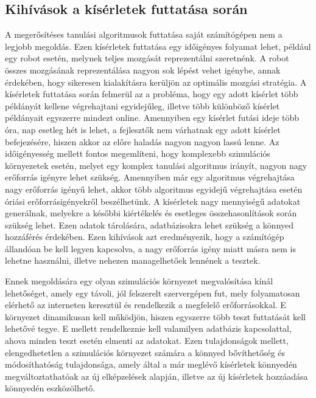\subsection{Kihívások a kísérletek futtatása során}
A megerősítéses tanulási algoritmusok futtatása saját számítógépen nem a legjobb megoldás. Ezen kísérletek futtatása egy időigényes folyamat lehet, például egy robot esetén, melynek teljes mozgását reprezentálni szeretnénk. A robot összes mozgásának reprezentálása nagyon sok lépést vehet igénybe, annak érdekében, hogy sikeresen kialakításra kerüljön az optimális mozgási stratégia. A kísérletek futtatása során felmerül az a probléma, hogy egy adott kísérlet több példányát  kellene végrehajtani egyidejűleg, illetve több különböző kísérlet példányait egyszerre mindezt online. Amennyiben egy kísérlet futási ideje több óra, nap esetleg hét is lehet, a fejlesztők nem várhatnak egy adott kísérlet befejezésére, hiszen akkor az előre haladás nagyon nagyon lassú lenne. Az időigényesség mellett fontos megemlíteni, hogy komplexebb szimulációs környezetek esetén, melyet egy komplex tanulási algoritmus irányít, nagyon nagy erőforrás igényre lehet szükség. Amennyiben már egy algoritmus végrehajtása nagy erőforrás igényű lehet, akkor több algoritmus egyidejű végrehajtása esetén óriási erőforrásigényekről beszélhetünk. A kísérletek nagy mennyiségű adatokat generálnak, melyekre a későbbi kiértékelés és esetleges összehasonlítások során szükség lehet. Ezen adatok tárolására, adatbázisokra lehet szükség a könnyed hozzáférés érdekében. Ezen kihívások azt eredményezik, hogy a számítógép állandóan be kell legyen kapcsolva, a nagy erőforrás igény miatt másra nem is lehetne használni, illetve nehezen managelhetőek lennének a tesztek.  

Ennek megoldására egy olyan szimulációs környezet megvalósítása kínál lehetőséget, amely egy távoli, jól felszerelt szervergépen fut, mely folyamatosan elérhető az interneten keresztül és rendelkezik a megfelelő erőforrásokkal. E környezet dinamikusan kell működjön, hiszen egyszerre több teszt futtatását kell lehetővé tegye. E mellett rendelkeznie kell valamilyen adatbázis kapcsolattal, ahova minden teszt esetén elmenti az adatokat. Ezen tulajdonságok mellett, elengedhetetlen a szimulációs környezet számára a könnyed bővíthetőség és módosíthatóság tulajdonsága, amely által a már meglévő kísérletek könnyedén megváltoztathatóak az új elképzelések alapján, illetve az új kísérletek hozzáadása könnyedén eszközölhető.

